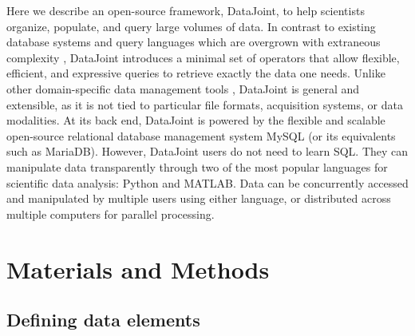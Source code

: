 \documentclass[10pt,letterpaper]{article}
\begin{document}
Here we describe an open-source framework, DataJoint, to help scientists organize, populate, and query large volumes of data.
In contrast to existing database systems and query languages which are overgrown with extraneous complexity \cite{date_sql_2011,manyam_relax_2012},
DataJoint introduces a minimal set of operators that allow flexible, efficient, and expressive queries to retrieve exactly the data one needs.
Unlike other domain-specific data management tools \cite{manyam_relax_2012, gunay_database_2009, schutter_review_2009, small_database-managed_2009, brown_overview_2010, shi_synapticdb_2011, pittendrigh_neurosys_2003}, DataJoint is general and extensible, as it is not tied to particular file formats, acquisition systems, or data modalities.
At its back end, DataJoint is powered by the flexible and scalable open-source relational database management system MySQL (or its equivalents such as MariaDB).
However, DataJoint users do not need to learn SQL. They can manipulate data transparently through two of the most popular languages for scientific data analysis: Python and MATLAB.
Data can be concurrently accessed and manipulated by multiple users using either language, or distributed across multiple computers for parallel processing.

\section*{Materials and Methods}
\subsection*{Defining data elements}
\end{document}
